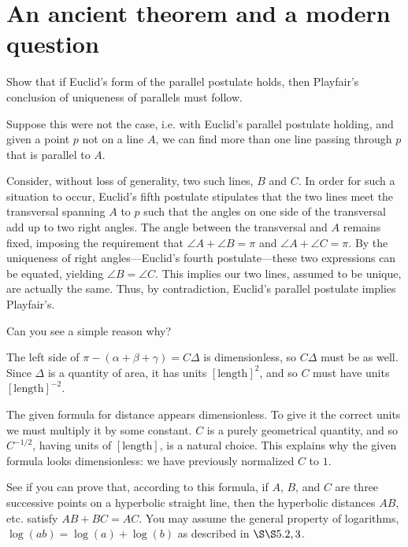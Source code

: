 \documentclass[../road-to-reality]{subfiles}
\begin{document}
\printanswers

\section{An ancient theorem and a modern question}

\begin{questions}
	
\question Show that if Euclid's form of the parallel postulate holds, then Playfair's conclusion of uniqueness of parallels must follow.

\begin{solution}
	Suppose this were not the case, i.e. with Euclid's parallel postulate holding, and given a point $p$ not on a line $A$, we can find more than one line passing through $p$ that is parallel to $A$.

	Consider, without loss of generality, two such lines, $B$ and $C$. In order for such a situation to occur, Euclid’s fifth postulate stipulates that the two lines meet the transversal spanning $A$ to $p$ such that the angles on one side of the transversal add up to two right angles. The angle between the transversal and $A$ remains fixed, imposing the requirement that $\angle{A}+\angle{B}=\pi$ and $\angle{A}+\angle{C}=\pi$. By the uniqueness of right angles---Euclid’s fourth postulate---these two expressions can be equated, yielding $\angle{B}=\angle{C}$. This implies our two lines, assumed to be unique, are actually the same. Thus, by contradiction, Euclid’s parallel postulate implies Playfair’s.
\end{solution}

\question Can you see a simple reason why?

\begin{solution}
	The left side of $\pi - (\alpha+\beta+\gamma)=C\Delta$ is dimensionless, so $C\Delta$ must be as well. Since $\Delta$ is a quantity of area, it has units $[\mathrm{length}]^2$, and so $C$ must have units $[\mathrm{length}]^{-2}$.

	The given formula for distance appears dimensionless. To give it the correct units we must multiply it by some constant. $C$ is a purely geometrical quantity, and so $C^{-1/2}$, having units of $[\mathrm{length}]$, is a natural choice. This explains why the given formula looks dimensionless: we have previously normalized $C$ to $1$.
\end{solution}

\question See if you can prove that, according to this formula, if $A$, $B$, and $C$ are three successive points on a hyperbolic straight line, then the hyperbolic distances $AB$, etc. satisfy $AB + BC = AC$. You may assume the general property of logarithms, $\log(ab)=\log(a)+\log(b)$ as described in $\S\S5.2, 3$.


\end{questions}
\end{document}
